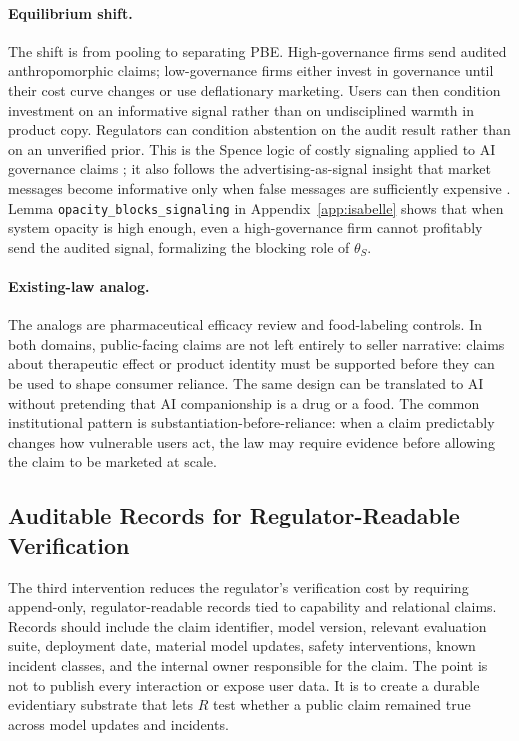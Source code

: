 \paragraph{Equilibrium shift.}
The shift is from pooling to separating PBE. High-governance firms send audited
anthropomorphic claims; low-governance firms either invest in governance until
their cost curve changes or use deflationary marketing. Users can then condition
investment on an informative signal rather than on undisciplined warmth in
product copy. Regulators can condition abstention on the audit result rather
than on an unverified prior. This is the Spence logic of costly signaling
applied to AI governance claims \citep{spence1973}; it also follows the
advertising-as-signal insight that market messages become informative only when
false messages are sufficiently expensive \citep{milgrom_roberts1986}. Lemma \texttt{opacity\_\allowbreak{}blocks\_\allowbreak{}signaling} in Appendix~\ref{app:isabelle} shows that when system opacity is high enough, even a high-governance firm cannot profitably send the audited signal, formalizing the blocking role of $\theta_S$.

\paragraph{Existing-law analog.}
The analogs are pharmaceutical efficacy review and food-labeling controls. In
both domains, public-facing claims are not left entirely to seller narrative:
claims about therapeutic effect or product identity must be supported before
they can be used to shape consumer reliance. The same design can be translated
to AI without pretending that AI companionship is a drug or a food. The common
institutional pattern is substantiation-before-reliance: when a claim predictably
changes how vulnerable users act, the law may require evidence before allowing
the claim to be marketed at scale.

\subsection{Auditable Records for Regulator-Readable Verification}
\label{subsec:auditable-records}

The third intervention reduces the regulator's verification cost by requiring
append-only, regulator-readable records tied to capability and relational
claims. Records should include the claim identifier, model version, relevant
evaluation suite, deployment date, material model updates, safety interventions,
known incident classes, and the internal owner responsible for the claim. The
point is not to publish every interaction or expose user data. It is to create a
durable evidentiary substrate that lets $R$ test whether a public claim remained
true across model updates and incidents.

